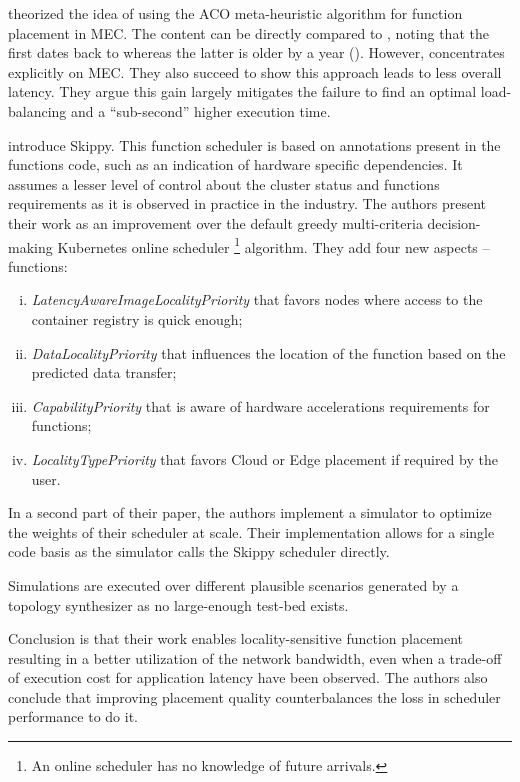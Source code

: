 \begin{description}[leftmargin=10pt]
	\item[\citet{palade_swarm-based_2020}] theorized the idea of using the \gls{ACO} meta-heuristic algorithm for function placement in \gls{MEC}. The content can be directly compared to \cite{mutichiro_qos-based_2021}, noting that the first dates back to  whereas the latter is older by a year (). However, \cite{palade_swarm-based_2020} concentrates explicitly on \gls{MEC}. They also succeed to show this approach leads to less overall latency. They argue this gain largely mitigates the failure to find an optimal load-balancing and a ``sub-second'' higher execution time.
	
	\item[\citet{rausch_optimized_2021}] introduce Skippy. This function scheduler is based on annotations present in the functions code, such as an indication of hardware specific dependencies. It assumes a lesser level of control about the cluster status and functions requirements as it is observed in practice in the industry. The authors present their work as an improvement over the default greedy multi-criteria decision-making Kubernetes online scheduler \footnote{An online scheduler has no knowledge of future arrivals.} algorithm. They add four new aspects -- functions:
	\begin{enumerate}[(i)]
		\item \emph{LatencyAwareImageLocalityPriority} that favors nodes where access to the container registry is quick enough;
		\item \emph{DataLocalityPriority} that influences the location of the function based on the predicted data transfer;
		\item \emph{CapabilityPriority} that is aware of hardware accelerations requirements for functions;
		\item \emph{LocalityTypePriority} that favors Cloud or Edge placement if required by the user.
	\end{enumerate}
	
	In a second part of their paper, the authors implement a simulator to optimize the weights of their scheduler at scale. Their implementation allows for a single code basis as the simulator calls the Skippy scheduler directly.
	
	Simulations are executed over different plausible scenarios generated by a topology synthesizer as no large-enough test-bed exists.
	
	Conclusion is that their work enables locality-sensitive function placement resulting in a better utilization of the network bandwidth, even when a trade-off of execution cost for application latency have been observed. The authors also conclude that improving placement quality counterbalances the loss in scheduler performance to do it.
	

\end{description}
